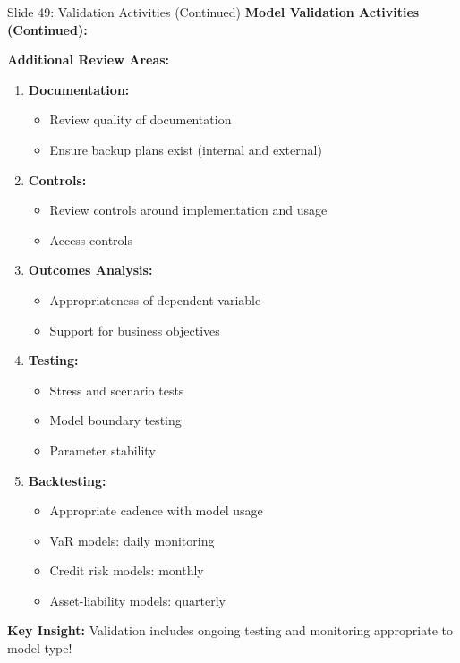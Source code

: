 \documentclass[8pt]{beamer}
\begin{document}
	\begin{frame}{Slide 49: Validation Activities (Continued)}
		\fontsize{6.5}{7.5}\selectfont
		\textbf{Model Validation Activities (Continued):}
		
		\vspace{0.1cm}
		\textbf{Additional Review Areas:}
		\begin{enumerate}
			\item \textbf{Documentation:}
			\begin{itemize}
				\item Review quality of documentation
				\item Ensure backup plans exist (internal and external)
			\end{itemize}
			\item \textbf{Controls:}
			\begin{itemize}
				\item Review controls around implementation and usage
				\item Access controls
			\end{itemize}
			\item \textbf{Outcomes Analysis:}
			\begin{itemize}
				\item Appropriateness of dependent variable
				\item Support for business objectives
			\end{itemize}
			\item \textbf{Testing:}
			\begin{itemize}
				\item Stress and scenario tests
				\item Model boundary testing
				\item Parameter stability
			\end{itemize}
			\item \textbf{Backtesting:}
			\begin{itemize}
				\item Appropriate cadence with model usage
				\item VaR models: daily monitoring
				\item Credit risk models: monthly
				\item Asset-liability models: quarterly
			\end{itemize}
		\end{enumerate}
		
		\textcolor{myblue}{\textbf{Key Insight:}} Validation includes \textcolor{myblue}{ongoing testing and monitoring appropriate to model type}!
	\end{frame}
	
\end{document}
